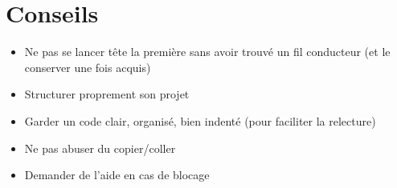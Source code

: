 \documentclass{article}
\begin{document}
\section{Conseils}

\begin{itemize}

\item Ne pas se lancer tête la première sans avoir trouvé un fil conducteur (et le conserver une fois acquis)

\item Structurer proprement son projet

\item Garder un code clair, organisé, bien indenté (pour faciliter la relecture)

\item Ne pas abuser du copier/coller

\item Demander de l'aide en cas de blocage

\end{itemize}
\end{document}
